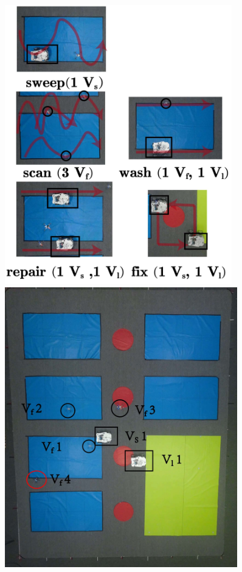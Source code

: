 \begin{figure}[t!]
  \begin{minipage}[t]{0.49\linewidth}
    \centering%
	\includegraphics[width =0.88\textwidth]{figures/hardware_experiment/washing.jpg}
\end{minipage}%
  \begin{minipage}[t]{0.49\linewidth}
    \centering
	\includegraphics[width =0.9\textwidth]{figures/hardware_experiment/experiment2.jpg}

\end{minipage}
\end{figure}
